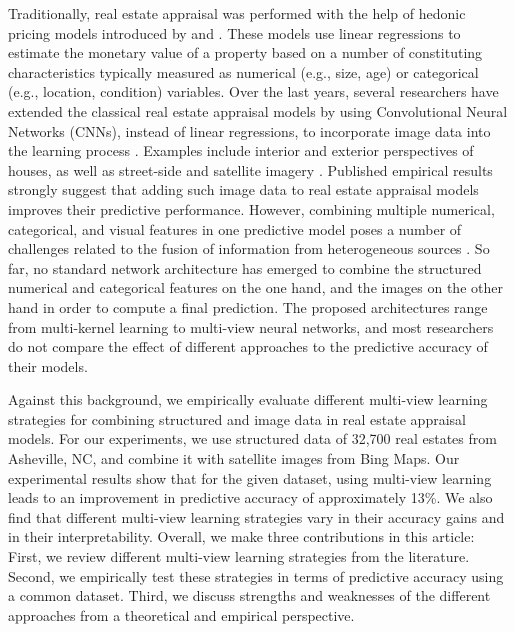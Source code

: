 \documentclass[letterpaper]{article}
\begin{document}
Traditionally, real estate appraisal was performed with the help of hedonic pricing models introduced by \citeauthor{lancaster1966new} \citeyearpar{lancaster1966new} and \citeauthor{rosen1974hedonic} \citeyearpar{rosen1974hedonic}. These models use linear regressions to estimate the monetary value of a property based on a number of constituting characteristics typically measured as numerical (e.g., size, age) or categorical (e.g., location, condition) variables. Over the last years, several researchers have extended the classical real estate appraisal models by using Convolutional Neural Networks (CNNs), instead of linear regressions, to incorporate image data into the learning process \cite{law2019take}. Examples include interior and exterior perspectives of houses, as well as street-side and satellite imagery \cite{law2019take, poursaeed2018vision, bency2017beyond, bessinger2016quantifying, liu2018learning, kucklick2020location}. Published empirical results strongly suggest that adding such image data to real estate appraisal models improves their predictive performance. However, combining multiple numerical, categorical, and visual features in one predictive model poses a number of challenges related to the fusion of information from heterogeneous sources \cite{li2018survey}. So far, no standard network architecture has emerged to combine the structured numerical and categorical features on the one hand, and the images on the other hand in order to compute a final prediction. The proposed architectures range from multi-kernel learning to multi-view neural networks, and most researchers do not compare the effect of different approaches to the predictive accuracy of their models.

Against this background, we empirically evaluate different multi-view learning strategies for combining structured and image data in real estate appraisal models. For our experiments, we use structured data of 32,700 real estates from Asheville, NC, and combine it with satellite images from Bing Maps. Our experimental results show that for the given dataset, using multi-view learning leads to an improvement in predictive accuracy of approximately 13\%. We also find that different multi-view learning strategies vary in their accuracy gains and in their interpretability. Overall, we make three contributions in this article: First, we review different multi-view learning strategies from the literature. Second, we empirically test these strategies in terms of predictive accuracy using a common dataset. Third, we discuss strengths and weaknesses of the different approaches from a theoretical and empirical perspective.
\end{document}
